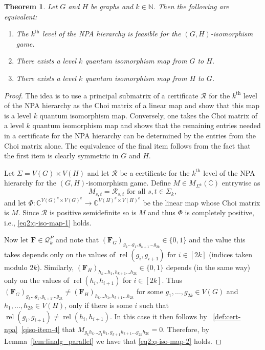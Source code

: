 \documentclass[a4paper,onecolumn,11pt,accepted=2026-01-06]{quantumarticle}
\theoremstyle{plain}
\newtheorem{thm}{Theorem}[section]
\theoremstyle{remark}
\theoremstyle{definition}
\DeclareMathOperator{\rel}{rel}
\begin{document}
\begin{thm}\label{thm:main-theorem-1}
    Let $G$ and $H$ be graphs and $k \in \mathbb{N}$. Then the following are equivalent:
    \begin{enumerate}
        \item The $k^\text{th}$ level of the NPA hierarchy is feasible for the $(G,H)$-isomorphism game.
        \item There exists a level $k$ quantum isomorphism map from $G$ to $H$.
        \item There exists a level $k$ quantum isomorphism map from $H$ to $G$.
    \end{enumerate}
\end{thm}
\begin{proof}
    The idea is to use a principal submatrix of a certificate $\mathcal{R}$ for the $k^\text{th}$ level of the NPA hierarchy as the Choi matrix of a linear map and show that this map is a level $k$ quantum isomorphism map. Conversely, one takes the Choi matrix of a level $k$ quantum isomorphism map and shows that the remaining entries needed in a certificate for the NPA hierarchy can be determined by the entries from the Choi matrix alone. The equivalence of the final item follows from the fact that the first item is clearly symmetric in $G$ and $H$.

    Let $\Sigma = V(G) \times V(H)$ and let $\mathcal{R}$ be a certificate for the $k^\text{th}$ level of the NPA hierarchy for the $(G,H)$-isomorphism game. Define $M \in M_{\Sigma^k}(\mathbb{C})$ entrywise as
    \[M_{s,t} = \mathcal{R}_{s,t} \text{ for all } s,t \in \Sigma_k,\]
    and let $\Phi : \mathbb{C}^{V(G)^k \times V(G)^k} \to \mathbb{C}^{V(H)^k \times V(H)^k}$ be the linear map whose Choi matrix is $M$. Since $\mathcal{R}$ is positive semidefinite so is $M$ and thus $\Phi$ is completely positive, i.e., \eqref{eq2:q-iso-map-1} holds.
    
    Now let $\boldsymbol{F} \in \mathcal{Q}_k^P$ and note that $(\boldsymbol{F}_G)_{g_k\ldots g_1, g_{k+1}\ldots g_{2k}} \in \{0,1\}$ and the value this takes depends only on the values of $\rel(g_i,g_{i+1})$ for $i \in [2k]$ (indices taken modulo $2k$). Similarly, $(\boldsymbol{F}_H)_{h_k\ldots h_1, h_{k+1}\ldots h_{2k}} \in \{0,1\}$ depends (in the same way) only on the values of $\rel(h_i,h_{i+1})$ for $i \in [2k]$. Thus $(\boldsymbol{F}_G)_{g_k\ldots g_1, g_{k+1}\ldots g_{2k}} \ne (\boldsymbol{F}_H)_{h_k\ldots h_1, h_{k+1}\ldots h_{2k}}$ for some $g_1, \ldots, g_{2k} \in V(G)$ and $h_1, \ldots, h_{2k} \in V(H)$, only if there is some $i$ such that $\rel(g_i,g_{i+1}) \ne \rel(h_i,h_{i+1})$. In this case it then follows by ~\cref{def:cert-npa}~\ref{qiso-item-4} that $M_{g_kh_k\ldots g_1h_1,g_{k+1}h_{k+1}\ldots g_{2k}h_{2k}} = 0$. Therefore, by Lemma~\ref{lem:linalg_parallel} we have that \eqref{eq2:q-iso-map-2} holds.


\end{proof}
\end{document}
